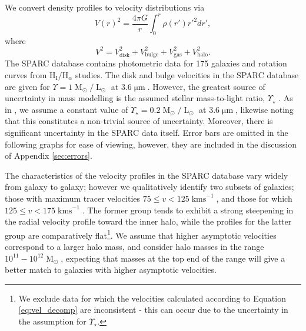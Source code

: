 \documentclass{pasa}%
\begin{document}
We convert  density profiles to velocity distributions \cite{Sofue:2008wt} via 
%
\begin{equation}
    V(r)^2 = \frac{4\pi G}{r}\int_0^r \rho(r')r'^2 dr',
\end{equation}
where 
\begin{equation}\label{eq:vel_decomp}
    V^2 = V_{\mathrm{disk}}^2 + V_{\mathrm{bulge}}^2 + V_{\mathrm{gas}}^2 + V_{\mathrm{halo}}^2.
\end{equation}
%
The SPARC database contains photometric data for 175 galaxies and rotation curves from $\mathrm{H}_{\mathrm{I}}$/$\mathrm{H}_{\alpha}$ studies. The disk and bulge velocities in the SPARC database are given for $\Upsilon = 1 \operatorname{M}_{\odot}/\operatorname{L}_{\odot}$ at $3.6\operatorname{\mu m}$. However, the greatest source of uncertainty in mass modelling is the assumed stellar mass-to-light ratio, $\Upsilon_\star$ \cite{Lelli:2016zqa}. As in \cite{Robles:2018fur}, we  assume a constant value of $\Upsilon_\star = 0.2 \operatorname{M}_{\odot}/\operatorname{L}_{\odot}$ at $3.6\operatorname{\mu m}$, likewise noting that  this constitutes a non-trivial source of uncertainty. Moreover, there is significant uncertainty in the SPARC data itself. Error bars are omitted in the following graphs for ease of viewing, however, they are included in the discussion of Appendix \ref{sec:errors}. 

The characteristics of the velocity profiles in the SPARC database vary widely from galaxy to galaxy; however we qualitatively identify two subsets of galaxies; those with maximum tracer velocities $75 \leq v < 125\operatorname{kms}^{-1}$, and those for which $125 \leq v < 175\operatorname{kms}^{-1}$. The former group tends to exhibit a strong steepening in the radial velocity profile toward the inner halo, while the  profiles for the latter group are comparatively flat\footnote{We exclude data for which the velocities calculated according to Equation \ref{eq:vel_decomp} are inconsistent - this can occur due to the uncertainty in the assumption for $\Upsilon_\star$.}. We assume that higher asymptotic velocities correspond to a larger halo mass, and consider halo masses in the range $10^{11} - 10^{12} \operatorname{M}_{\odot}$, expecting that masses at the top end of the range will give a better match to galaxies with higher asymptotic velocities. 
\end{document}
